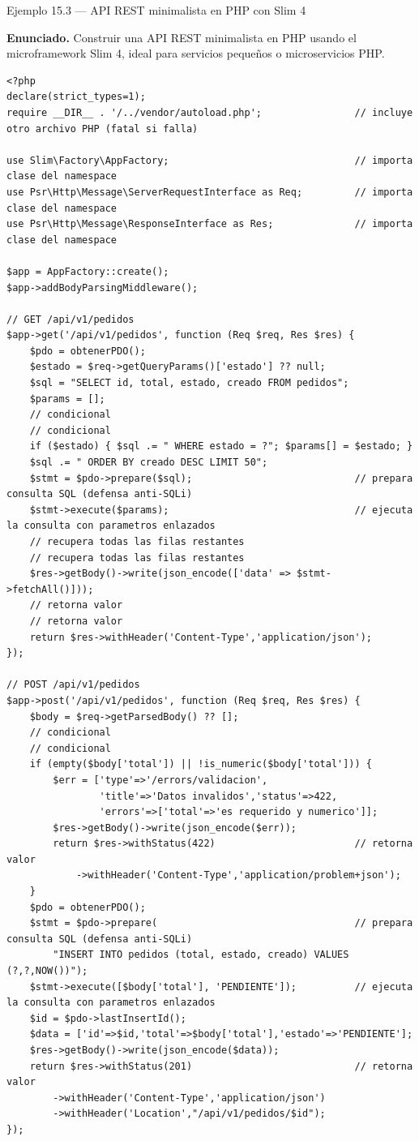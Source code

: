 \documentclass[11pt,a4paper,openany]{book}
\begin{document}
\begin{cajaejemplo}{Ejemplo 15.3 --- API REST minimalista en PHP con Slim 4}

\textbf{Enunciado.} Construir una API REST minimalista en PHP usando el microframework Slim 4, ideal para servicios pequeños o microservicios PHP.

\begin{lstlisting}[style=php,caption={public/index.php},label=lst:15.5]
<?php
declare(strict_types=1);
require __DIR__ . '/../vendor/autoload.php';                // incluye otro archivo PHP (fatal si falla)

use Slim\Factory\AppFactory;                                // importa clase del namespace
use Psr\Http\Message\ServerRequestInterface as Req;         // importa clase del namespace
use Psr\Http\Message\ResponseInterface as Res;              // importa clase del namespace

$app = AppFactory::create();
$app->addBodyParsingMiddleware();

// GET /api/v1/pedidos
$app->get('/api/v1/pedidos', function (Req $req, Res $res) {
    $pdo = obtenerPDO();
    $estado = $req->getQueryParams()['estado'] ?? null;
    $sql = "SELECT id, total, estado, creado FROM pedidos";
    $params = [];
    // condicional
    // condicional
    if ($estado) { $sql .= " WHERE estado = ?"; $params[] = $estado; }
    $sql .= " ORDER BY creado DESC LIMIT 50";
    $stmt = $pdo->prepare($sql);                            // prepara consulta SQL (defensa anti-SQLi)
    $stmt->execute($params);                                // ejecuta la consulta con parametros enlazados
    // recupera todas las filas restantes
    // recupera todas las filas restantes
    $res->getBody()->write(json_encode(['data' => $stmt->fetchAll()]));
    // retorna valor
    // retorna valor
    return $res->withHeader('Content-Type','application/json');
});

// POST /api/v1/pedidos
$app->post('/api/v1/pedidos', function (Req $req, Res $res) {
    $body = $req->getParsedBody() ?? [];
    // condicional
    // condicional
    if (empty($body['total']) || !is_numeric($body['total'])) {
        $err = ['type'=>'/errors/validacion',
                'title'=>'Datos invalidos','status'=>422,
                'errors'=>['total'=>'es requerido y numerico']];
        $res->getBody()->write(json_encode($err));
        return $res->withStatus(422)                        // retorna valor
            ->withHeader('Content-Type','application/problem+json');
    }
    $pdo = obtenerPDO();
    $stmt = $pdo->prepare(                                  // prepara consulta SQL (defensa anti-SQLi)
        "INSERT INTO pedidos (total, estado, creado) VALUES (?,?,NOW())");
    $stmt->execute([$body['total'], 'PENDIENTE']);          // ejecuta la consulta con parametros enlazados
    $id = $pdo->lastInsertId();
    $data = ['id'=>$id,'total'=>$body['total'],'estado'=>'PENDIENTE'];
    $res->getBody()->write(json_encode($data));
    return $res->withStatus(201)                            // retorna valor
        ->withHeader('Content-Type','application/json')
        ->withHeader('Location',"/api/v1/pedidos/$id");
});


\end{lstlisting}
\end{cajaejemplo}
\end{document}
